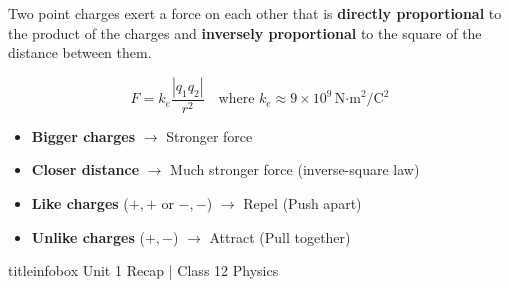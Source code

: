 \begin{frame}
\begin{frame}
\vspace{-0.05cm}

\begin{importantbox}
\vspace{0.1cm}
Two point charges exert a force on each other that is \textbf{directly proportional} to the product of the charges and \textbf{inversely proportional} to the square of the distance between them.
\vspace{0.1cm}
\end{importantbox}

\vspace{0.35cm}

\begin{formulabox}
\vspace{0.2cm}
\begin{equation*}
\boxed{F = k_e \frac{|q_1 q_2|}{r^2}} \quad \text{where } k_e \approx 9 \times 10^9 \, \text{N·m}^2/\text{C}^2
\end{equation*}
\end{formulabox}

\vspace{0.35cm}

\begin{examplebox}
\vspace{0.1cm}
\begin{itemize}
    \item \textbf{Bigger charges} $\rightarrow$ Stronger force
    \item \textbf{Closer distance} $\rightarrow$ Much stronger force (inverse-square law)
    \item \textbf{Like charges} ($+,+$ or $-,-$) $\rightarrow$ \textcolor{importantRed}{Repel} (Push apart)
    \item \textbf{Unlike charges} ($+,-$) $\rightarrow$ \textcolor{familiarGreen}{Attract} (Pull together)
\end{itemize}
\vspace{0.1cm}
\end{examplebox}

\vfill

\begin{beamercolorbox}[wd=\textwidth,ht=0.5cm,dp=0.1cm,center]{titleinfobox}
    \small\color{coolgray} Unit 1 Recap | Class 12 Physics
\end{beamercolorbox}
\end{frame}


\end{frame}

